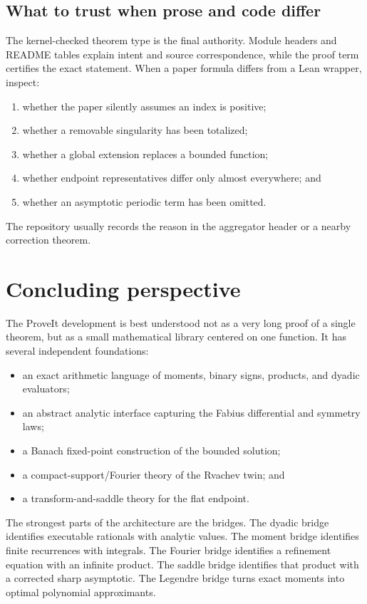 \documentclass[11pt,oneside]{report}
\theoremstyle{definition}
\theoremstyle{remark}
\begin{document}
\section{What to trust when prose and code differ}
The kernel-checked theorem type is the final authority.  Module headers and README tables explain intent and source correspondence, while the proof term certifies the exact statement.  When a paper formula differs from a Lean wrapper, inspect:
\begin{enumerate}
  \item whether the paper silently assumes an index is positive;
  \item whether a removable singularity has been totalized;
  \item whether a global extension replaces a bounded function;
  \item whether endpoint representatives differ only almost everywhere; and
  \item whether an asymptotic periodic term has been omitted.
\end{enumerate}
The repository usually records the reason in the aggregator header or a nearby correction theorem.

\chapter{Concluding perspective}
The ProveIt development is best understood not as a very long proof of a single theorem, but as a small mathematical library centered on one function.  It has several independent foundations:
\begin{itemize}
  \item an exact arithmetic language of moments, binary signs, products, and dyadic evaluators;
  \item an abstract analytic interface capturing the Fabius differential and symmetry laws;
  \item a Banach fixed-point construction of the bounded solution;
  \item a compact-support/Fourier theory of the Rvachev twin; and
  \item a transform-and-saddle theory for the flat endpoint.
\end{itemize}
The strongest parts of the architecture are the bridges.  The dyadic bridge identifies executable rationals with analytic values.  The moment bridge identifies finite recurrences with integrals.  The Fourier bridge identifies a refinement equation with an infinite product.  The saddle bridge identifies that product with a corrected sharp asymptotic.  The Legendre bridge turns exact moments into optimal polynomial approximants.
\end{document}
